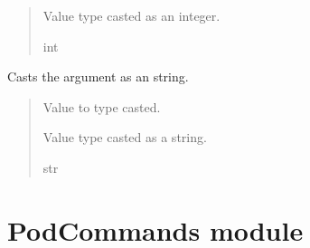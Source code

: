 \documentclass[letterpaper,10pt,english]{sphinxmanual}
\begin{document}
\begin{fulllineitems}
\begin{fulllineitems}
\begin{quote}
\begin{description}
\sphinxAtStartPar
Value type casted as an integer.

\sphinxAtStartPar
int

\end{description}\end{quote}

\end{fulllineitems}


\begin{fulllineitems}
\label{\detokenize{GetUserInput:GetUserInput.UserInput.CastStr}}
\pysigstartsignatures
{}
\pysigstopsignatures
\sphinxAtStartPar
Casts the argument as an string.
\begin{quote}\begin{description}
\sphinxAtStartPar
{} \textendash{} Value to type casted.

\sphinxAtStartPar
Value type casted as a string.

\sphinxAtStartPar
str

\end{description}\end{quote}

\end{fulllineitems}


\end{fulllineitems}


\sphinxstepscope


\section{PodCommands module}
\label{\detokenize{PodCommands:module-PodCommands}}\label{\detokenize{PodCommands:podcommands-module}}\label{\detokenize{PodCommands::doc}}
\end{document}
